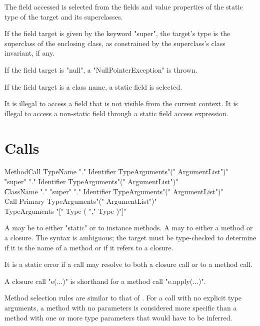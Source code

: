 The field accessed is selected from the fields and value properties
of the static type of the target and its superclasses.

If the field target is given by the keyword \xcd"super",
the target's type is
the superclass of the enclosing class, as
constrained by the superclass's class invariant, if any.

If the field target is \xcd"null", a \xcd"NullPointerException"
is thrown.

If the field target is a class name, a static field is selected.

It is illegal to access  a field that is not visible from
the current context.
It is illegal to access a non-static field
through a static field access expression.



\section{Calls}
\label{Call}
\label{MethodInvocation}
\label{MethodInvocationSubstitution}

\begin{grammar}
MethodCall \: TypeName \xcd"." Identifier TypeArguments\opt \xcd"(" ArgumentList\opt \xcd")" \\
           \| \xcd"super" \xcd"." Identifier TypeArguments\opt \xcd"(" ArgumentList\opt \xcd")" \\
           \| ClassName \xcd"." \xcd"super" \xcd"." Identifier TypeArguments\opt \xcd"(" ArgumentList\opt \xcd")" \\
Call \: Primary TypeArguments\opt \xcd"(" ArgumentList\opt \xcd")" \\
TypeArguments \: \xcd"[" Type ( \xcd"," Type )\star \xcd"]" \\
\end{grammar}

A  may be to either \xcd"static" or to
instance methods.  A  may to either a method
or a closure.  The syntax is ambiguous; the target must be
type-checked to determine if it is the name of a method or if it
refers to a closure.

It is a static error if a call may resolve to both a closure
call or to a method call.  

A closure call \xcdmath"e($\dots$)" is shorthand for a method call \xcdmath"e.apply($\dots$)".

Method selection rules are similar to that of \java{}.
For a call with no explicit type arguments, a method with 
no parameters is considered more specific than a method with one or more
type parameters that would have to be inferred.

